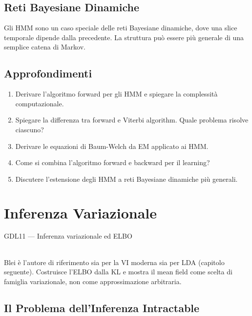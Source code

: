 \section{Reti Bayesiane Dinamiche}

Gli HMM sono un caso speciale delle reti Bayesiane dinamiche, dove una slice temporale dipende dalla precedente. La struttura può essere più generale di una semplice catena di Markov.

\section{Approfondimenti}

\begin{tcolorbox}[title=Domande d'Esame]
  \begin{enumerate}
    \item Derivare l'algoritmo forward per gli HMM e spiegare la complessità computazionale.
    \item Spiegare la differenza tra forward e Viterbi algorithm. Quale problema risolve ciascuno?
    \item Derivare le equazioni di Baum-Welch da EM applicato ai HMM.
    \item Come si combina l'algoritmo forward e backward per il learning?
    \item Discutere l'estensione degli HMM a reti Bayesiane dinamiche più generali.
  \end{enumerate}
\end{tcolorbox}

\chapter{Inferenza Variazionale}\label{ch:variational}

\begin{risorsevideo}{GDL11 — Inferenza variazionale ed ELBO}

\medskip
{}\\
Blei è l'autore di riferimento sia per la VI moderna sia per LDA (capitolo seguente). Costruisce l'ELBO dalla KL e mostra il mean field come scelta di famiglia variazionale, non come approssimazione arbitraria.
\end{risorsevideo}

\section{Il Problema dell'Inferenza Intractable}

